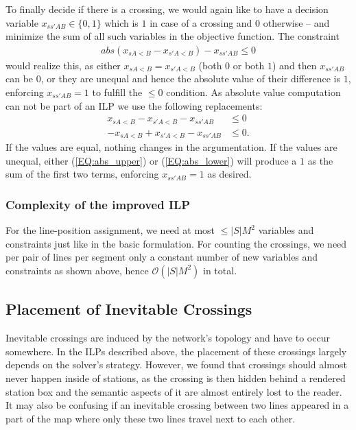 \documentclass{llncs}
\begin{document}
To finally decide if there is a crossing, we would again like to have a decision variable $x_{ss'AB} \in \{0,1\}$ which is $1$ in case of a crossing and $0$ otherwise -- and minimize the sum of all such variables in the objective function.
The constraint
\begin{gather}
	abs(x_{sA<B}-x_{s'A<B}) - x_{ss'AB} \leq 0
\end{gather}
would realize this, as either $x_{sA<B} = x_{s'A<B}$ (both $0$ or both $1$) and then $x_{ss'AB}$ can be $0$, or they are unequal and hence the absolute value of their difference is $1$, enforcing $x_{ss'AB}=1$ to fulfill the $\leq 0$ condition. As absolute value computation can not be part of an ILP we use the following replacements:
\begin{align}
	x_{sA<B} - x_{s'A<B} - x_{ss'AB} &\leq 0 \label{EQ:abs_upper}\\
	-x_{sA<B} + x_{s'A<B} - x_{ss'AB} &\leq 0. \label{EQ:abs_lower}
\end{align}
If the values are equal, nothing changes in the argumentation. If the values are unequal, either (\ref{EQ:abs_upper}) or (\ref{EQ:abs_lower})  will produce a $1$ as the sum of the first two terms, enforcing $x_{ss'AB}=1$ as desired.

\subsubsection{Complexity of the improved ILP}
For the line-position assignment, we need at most $\leq |S|M^{2}$ variables and constraints just like in the basic formulation. For counting the  crossings, we need per pair of lines per segment only a constant number of new variables and constraints as shown above, hence $\mathcal{O}(|S|M^{2})$ in total.

\subsection{Placement of Inevitable Crossings}\label{SEC:crossing_placement}

Inevitable crossings are induced by the network's topology and have to occur somewhere. In the ILPs described above, the placement of these crossings largely depends on the solver's strategy.
However, we found that crossings should almost never happen inside of stations, as the crossing is then hidden behind a rendered station box and the semantic aspects of it are almost entirely lost to the reader. It may also be confusing if an inevitable crossing between two lines appeared in a part of the map where only these two lines travel next to each other.
\end{document}
